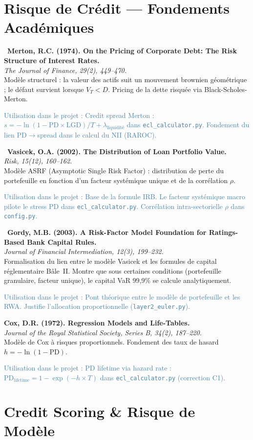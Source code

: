 \documentclass[12pt,a4paper]{article}
\newcommand{\bibentry}[4]{%
  \noindent\textbf{#1}\\
  \textit{#2}\\
  #3\par
  \textcolor{steelblue}{\footnotesize\textsf{Utilisation dans le projet :} #4}\par
  \medskip
}
\newcommand{\bibentrystar}[4]{%
  \noindent{\color{goldstar}$\bigstar$}~\textbf{#1}\\
  \textit{#2}\\
  #3\par
  \textcolor{steelblue}{\footnotesize\textsf{Utilisation dans le projet :} #4}\par
  \medskip
}
\begin{document}
\section{Risque de Crédit --- Fondements Académiques}

\bibentrystar{Merton, R.C. (1974). On the Pricing of Corporate Debt: The Risk Structure of Interest Rates.}{\emph{The Journal of Finance}, 29(2), 449--470.}{Modèle structurel : la valeur des actifs suit un mouvement brownien géométrique ; le défaut survient lorsque $V_T < D$. Pricing de la dette risquée via Black-Scholes-Merton.}{Credit spread Merton : $s = -\ln(1 - \text{PD} \times \text{LGD})/T + \lambda_\text{liquidité}$ dans \texttt{ecl\_calculator.py}. Fondement du lien PD$\to$spread dans le calcul du NII (RAROC).}

\bibentrystar{Vasicek, O.A. (2002). The Distribution of Loan Portfolio Value.}{\emph{Risk}, 15(12), 160--162.}{Modèle ASRF (Asymptotic Single Risk Factor) : distribution de perte du portefeuille en fonction d'un facteur systémique unique et de la corrélation $\rho$.}{Base de la formule IRB. Le facteur systémique macro pilote le stress PD dans \texttt{ecl\_calculator.py}. Corrélation intra-sectorielle $\rho$ dans \texttt{config.py}.}

\bibentrystar{Gordy, M.B. (2003). A Risk-Factor Model Foundation for Ratings-Based Bank Capital Rules.}{\emph{Journal of Financial Intermediation}, 12(3), 199--232.}{Formalisation du lien entre le modèle Vasicek et les formules de capital réglementaire Bâle~II. Montre que sous certaines conditions (portefeuille granulaire, facteur unique), le capital VaR 99,9\% se calcule analytiquement.}{Pont théorique entre le modèle de portefeuille et les RWA. Justifie l'allocation proportionnelle (\texttt{layer2\_euler.py}).}

\bibentry{Cox, D.R. (1972). Regression Models and Life-Tables.}{\emph{Journal of the Royal Statistical Society, Series B}, 34(2), 187--220.}{Modèle de Cox à risques proportionnels. Fondement des taux de hasard $h = -\ln(1 - \text{PD})$.}{PD lifetime via hazard rate : $\text{PD}_\text{lifetime} = 1 - \exp(-h \times T)$ dans \texttt{ecl\_calculator.py} (correction C1).}

\section{Credit Scoring \& Risque de Modèle}
\end{document}
